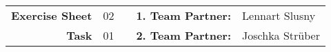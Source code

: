 
\newcommand{\obenlinks}{Recurrent and Generative Artificial Neural Networks}

\begin{center}
	\begin{tabular}{|rlp{4cm}rl|}
	\hline
	 \textbf{Exercise Sheet} & 02  &  & \textbf{1. Team Partner:} & Lennart Slusny  \\
	 \textbf{Task} & 01 & & \textbf{2. Team Partner:} & Joschka Strüber \\ \hline
	\end{tabular}
\end{center} 



